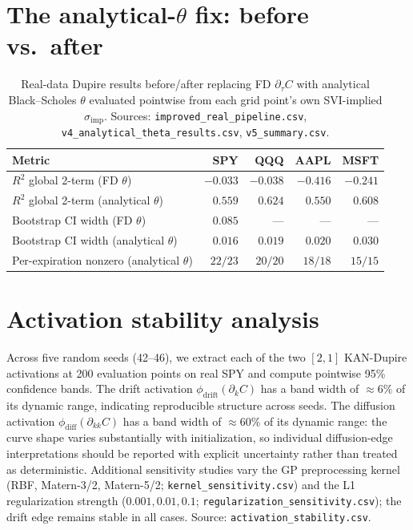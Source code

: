 \documentclass[10pt]{article}
\begin{document}
\section{The analytical-$\theta$ fix: before vs.\ after}\label{app:tau-fix}
\begin{table}[h]
\centering\footnotesize
\caption{Real-data Dupire results before/after replacing FD $\partial_\tau C$ with analytical Black--Scholes $\theta$ evaluated pointwise from each grid point's own SVI-implied $\sigma_{\text{imp}}$. Sources: \texttt{improved\_real\_pipeline.csv}, \texttt{v4\_analytical\_theta\_results.csv}, \texttt{v5\_summary.csv}.}
\begin{tabular}{lrrrr}
\toprule
Metric & SPY & QQQ & AAPL & MSFT \\
\midrule
$R^2$ global 2-term (FD $\theta$)          & $-0.033$ & $-0.038$ & $-0.416$ & $-0.241$ \\
$R^2$ global 2-term (analytical $\theta$)  & $\mathbf{0.559}$ & $\mathbf{0.624}$ & $\mathbf{0.550}$ & $\mathbf{0.608}$ \\
Bootstrap CI width (FD $\theta$)           & $0.085$ & --- & --- & --- \\
Bootstrap CI width (analytical $\theta$)   & $\mathbf{0.016}$ & $\mathbf{0.019}$ & $\mathbf{0.020}$ & $\mathbf{0.030}$ \\
Per-expiration nonzero (analytical $\theta$) & $22/23$ & $20/20$ & $18/18$ & $15/15$ \\
\bottomrule
\end{tabular}
\end{table}

\section{Activation stability analysis}\label{app:stability}

Across five random seeds (42--46), we extract each of the two $[2,1]$ KAN-Dupire activations at 200 evaluation points on real SPY and compute pointwise 95\% confidence bands. The drift activation $\phi_{\text{drift}}(\partial_k C)$ has a band width of ${\approx}6\%$ of its dynamic range, indicating reproducible structure across seeds. The diffusion activation $\phi_{\text{diff}}(\partial_{kk} C)$ has a band width of ${\approx}60\%$ of its dynamic range: the curve shape varies substantially with initialization, so individual diffusion-edge interpretations should be reported with explicit uncertainty rather than treated as deterministic. Additional sensitivity studies vary the GP preprocessing kernel (RBF, Matern-3/2, Matern-5/2; \texttt{kernel\_sensitivity.csv}) and the L1 regularization strength ($0.001, 0.01, 0.1$; \texttt{regularization\_sensitivity.csv}); the drift edge remains stable in all cases. Source: \texttt{activation\_stability.csv}.
\end{document}
